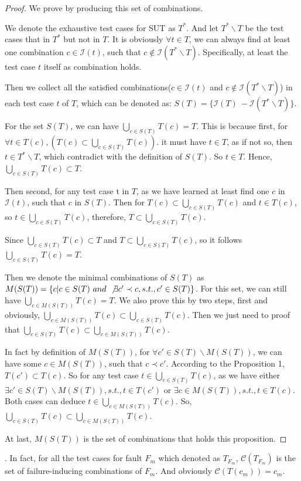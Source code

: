 \documentclass{sig-alternate}
\begin{document}
\begin{proof}
We prove by producing this set of combinations.

We denote the exhaustive test cases for SUT as $T^{*}$. And let $T^{*} \backslash T$ be the test cases that in $T^{*}$ but not in $T$. It is obviously $\forall t \in T $, we can always find at least one combination $c \in \mathcal{I}(t)$, such that $c \not\in \mathcal{I}(T^{*} \backslash T)$. Specifically, at least the test case $t$ itself as combination holds.

Then we collect all the satisfied combinations($c \in \mathcal{I}(t)$  and $c \not\in \mathcal{I}(T^{*} \backslash T)$) in each test case $t$ of $T$, which can be denoted as:
$S(T) = \{ \mathcal{I}(T)\ - \mathcal{I}(T^{*} \backslash T) \}$.

For the set $S(T)$, we can have $ \bigcup_{c \in S(T)}T(c) = T$. This is because first, for $\forall t \in T(c), (T(c) \subset \bigcup_{c \in S(T)}T(c))$. it must have $t \in T$, as if not so, then $t \in T^{*} \backslash T$, which contradict with the definition of $S(T)$. So $t \in T$. Hence, $\bigcup_{c \in S(T)}T(c) \subset T$.

Then second, for any test case t in $T$, as we have learned at least find one $c$ in $\mathcal{I}(t)$, such that $c$ in $S(T)$. Then for $T(c) \subset \bigcup_{c \in S(T)} T(c)$ and $t \in T(c)$, so $t \in \bigcup_{c \in S(T)} T(c)$, therefore,  $ T \subset \bigcup_{c \in S(T)}T(c)$.

Since $\bigcup_{c \in S(T)}T(c) \subset T$ and $ T \subset \bigcup_{c \in S(T)}T(c)$, so it follows $\bigcup_{c \in S(T)}T(c) = T$.

Then we denote the minimal combinations of $S(T)$ as $M(S(T)) = \{c | c \in S(T)\ and\ \not\exists c' \prec c, s.t., c' \in S(T)\}$. For this set, we can still have $ \bigcup_{c \in M(S(T))} T(c) = T$. We also prove this by two steps, first and obviously, $\bigcup_{c \in M(S(T))} T(c) \subset \bigcup_{c \in S(T)} T(c)$. Then we just need to proof that $\bigcup_{c \in S(T)} T(c) \subset \bigcup_{c \in M(S(T))} T(c)$.

In fact by definition of $M(S(T))$, for $\forall c'\in S(T) \backslash M(S(T))$,  we can have some $c \in M(S(T))$, such that $c \prec c'$. According to the Proposition 1, $T(c') \subset T(c)$. So for any test case $t \in \bigcup_{c \in S(T)} T(c) $, as we have either $\exists c'\in S(T) \backslash M(S(T)), s.t., t \in T(c')$ or $\exists c \in M(S(T)), s.t., t \in T(c)$. Both cases can deduce $t \in \bigcup_{c \in M(S(T))} T(c)$. So, $\bigcup_{c \in S(T)} T(c) \subset \bigcup_{c \in M(S(T))} T(c)$.

At last, $M(S(T))$ is the set of combinations that holds this proposition.
\end{proof}.
In fact, for all the test cases for fault $F_{m}$ which denoted as $T_{F_{m}}$, $\mathcal{C}(T_{F_{m}})$ is the set of failure-inducing combinations of $F_{m}$. And obviously $\mathcal{C}(T(c_{m})) = c_{m}$.
\end{document}
